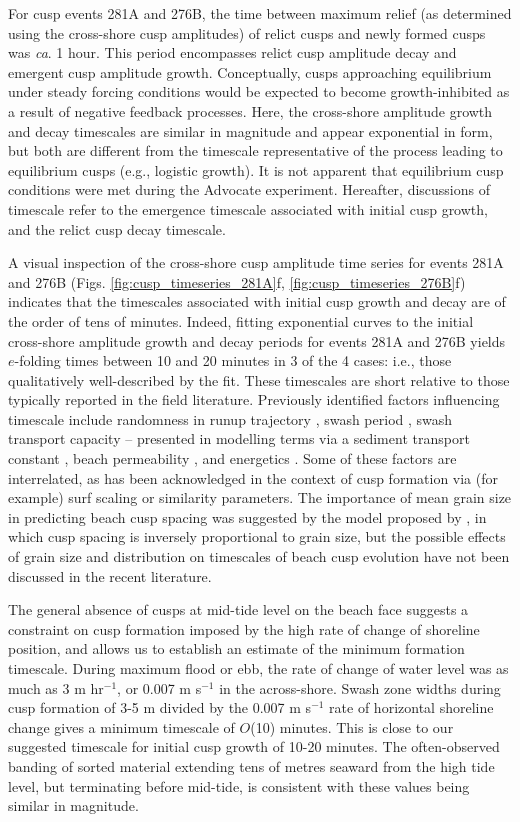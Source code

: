 For cusp events 281A and 276B, the time between maximum relief (as determined using the cross-shore cusp amplitudes) of relict cusps and newly formed cusps was \textit{ca}. 1 hour. This period encompasses relict cusp amplitude decay and emergent cusp amplitude growth. Conceptually, cusps approaching equilibrium under steady forcing conditions would be expected to become growth-inhibited as a result of negative feedback processes. Here, the cross-shore amplitude growth and decay timescales are similar in magnitude and appear exponential in form, but both are different from the timescale representative of the process leading to equilibrium cusps (e.g., logistic growth). It is not apparent that equilibrium cusp conditions were met during the Advocate experiment. Hereafter, discussions of timescale refer to the emergence timescale associated with initial cusp growth, and the relict cusp decay timescale.  

A visual inspection of the cross-shore cusp amplitude time series for events 281A and 276B (Figs. \ref{fig:cusp_timeseries_281A}f, \ref{fig:cusp_timeseries_276B}f) indicates that the timescales associated with initial cusp growth and decay are of the order of tens of minutes. Indeed, fitting exponential curves to the initial cross-shore amplitude growth and decay periods for events 281A and 276B yields $e$-folding times between 10 and 20 minutes in 3 of the 4 cases: i.e., those qualitatively well-described by the fit. These timescales are short relative to those typically reported in the field literature. Previously identified factors influencing timescale include randomness in runup trajectory \citep{Coco_etal2000}, swash period \citep{Dodd_etal2008}, swash transport capacity -- presented in modelling terms via a sediment transport constant \citep{Coco_etal2000, Dodd_etal2008}, beach permeability \citep{Dodd_etal2008}, and energetics \citep{Garnier_etal2010}. Some of these factors are interrelated, as has been acknowledged in the context of cusp formation via (for example) surf scaling or similarity parameters. The importance of mean grain size in predicting beach cusp spacing was suggested by the model proposed by \citet{Sunamura2004}, in which cusp spacing is inversely proportional to grain size, but the possible effects of grain size and distribution on timescales of beach cusp evolution have not been discussed in the recent literature.

The general absence of cusps at mid-tide level on the beach face suggests a constraint on cusp formation imposed by the high rate of change of shoreline position, and allows us to establish an estimate of the minimum formation timescale. During maximum flood or ebb, the rate of change of water level was as much as 3 m hr$^{-1}$, or 0.007 m s$^{-1}$ in the across-shore. Swash zone widths during cusp formation of 3-5 m divided by the 0.007 m s$^{-1}$ rate of horizontal shoreline change gives a minimum timescale of $O$(10) minutes. This is close to our suggested timescale for initial cusp growth of 10-20 minutes. The often-observed banding of sorted material extending tens of metres seaward from the high tide level, but terminating before mid-tide, is consistent with these values being similar in magnitude. 

